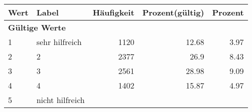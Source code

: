      \begin{longtable}{lXrrr}
     \toprule
     \textbf{Wert} & \textbf{Label} & \textbf{Häufigkeit} & \textbf{Prozent(gültig)} & \textbf{Prozent} \\
     \endhead
     \midrule
     \multicolumn{5}{l}{\textbf{Gültige Werte}}\\

     1 &
     \multicolumn{1}{X}{ sehr hilfreich   } &


       \num{1120} &
       \num[round-mode=places,round-precision=2]{12.68} &
         \num[round-mode=places,round-precision=2]{3.97} \\

     2 &
     \multicolumn{1}{X}{ 2   } &


       \num{2377} &
       \num[round-mode=places,round-precision=2]{26.9} &
         \num[round-mode=places,round-precision=2]{8.43} \\

     3 &
     \multicolumn{1}{X}{ 3   } &


       \num{2561} &
       \num[round-mode=places,round-precision=2]{28.98} &
         \num[round-mode=places,round-precision=2]{9.09} \\

     4 &
     \multicolumn{1}{X}{ 4   } &


       \num{1402} &
       \num[round-mode=places,round-precision=2]{15.87} &
         \num[round-mode=places,round-precision=2]{4.97} \\

     5 &
     \multicolumn{1}{X}{ nicht hilfreich   } &



\end{longtable}
